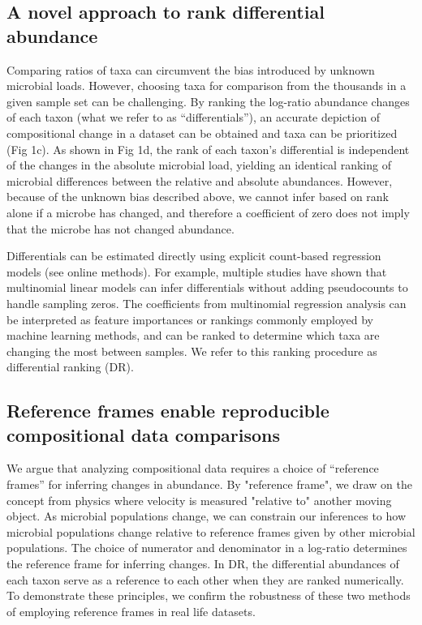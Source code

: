 \subsection{A novel approach to rank differential abundance}
Comparing ratios of taxa can circumvent the bias introduced by unknown microbial loads. However, choosing taxa for comparison from the thousands in a given sample set can be challenging. By ranking the log-ratio abundance changes of each taxon (what we refer to as “differentials”), an accurate depiction of compositional change in a dataset can be obtained and taxa can be prioritized (Fig 1c). As shown in Fig 1d, the rank of each taxon’s differential is independent of the changes in the absolute microbial load, yielding an identical ranking of microbial differences between the relative and absolute abundances. However, because of the unknown bias described above, we cannot infer based on rank alone if a microbe has changed, and therefore a coefficient of zero does not imply that the microbe has not changed abundance.

Differentials can be estimated directly using explicit count-based regression models (see online methods). For example, multiple studies have shown that multinomial linear models can infer differentials without adding pseudocounts to handle sampling zeros\cite{Silverman2018-ql,Aijo2018-jp, Grantham2017-gv,Xia2013-nd}. The coefficients from multinomial regression analysis can be interpreted as feature importances or rankings commonly employed by machine learning methods, and can be ranked to determine which taxa are changing the most between samples. We refer to this ranking procedure as differential ranking (DR).

\subsection{Reference frames enable reproducible compositional data comparisons}
We argue that analyzing compositional data requires a choice of “reference frames” for inferring changes in abundance. By "reference frame", we draw on the concept from physics where velocity is measured "relative to" another moving object. As microbial populations change, we can constrain our inferences to how microbial populations change relative to reference frames given by other microbial populations. The choice of numerator and denominator in a log-ratio determines the reference frame for inferring changes. In DR, the differential abundances of each taxon serve as a reference to each other when they are ranked numerically. To demonstrate these principles, we confirm the robustness of these two methods of employing reference frames in real life datasets.

